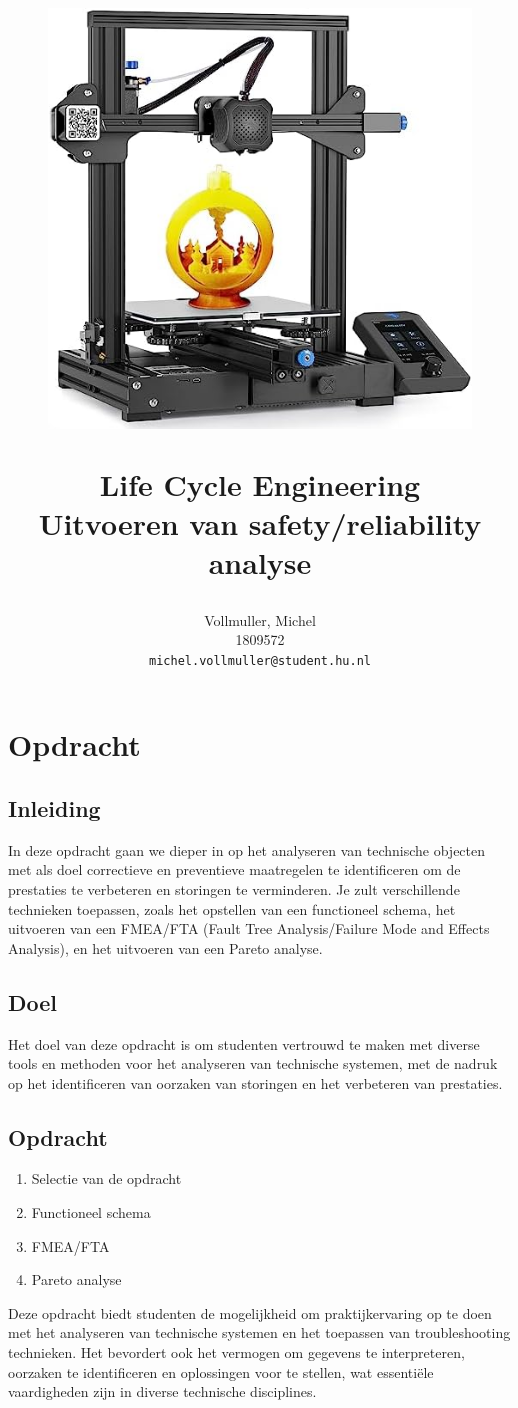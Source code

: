 \documentclass{article}
\title{
    \begin{figure}[H]
        \centering
        \includegraphics[scale = 1]{ender3.jpg} %
    \end{figure}
    Life Cycle Engineering \\
    \large Uitvoeren van safety/reliability analyse}
\author{
  Vollmuller, Michel\\
  1809572\\
  \texttt{michel.vollmuller@student.hu.nl}
}
\begin{document}
\maketitle

\tableofcontents

\setlength{\parindent}{0pt} %

\newpage
\section{Opdracht}
\subsection{Inleiding}
In deze opdracht gaan we dieper in op het analyseren van technische objecten met als doel correctieve en preventieve maatregelen te identificeren om de prestaties te verbeteren en storingen te verminderen. Je zult verschillende technieken toepassen, zoals het opstellen van een functioneel schema, het uitvoeren van een FMEA/FTA (Fault Tree Analysis/Failure Mode and Effects Analysis), en het uitvoeren van een Pareto analyse.

\subsection{Doel}
Het doel van deze opdracht is om studenten vertrouwd te maken met diverse tools en methoden voor het analyseren van technische systemen, met de nadruk op het identificeren van oorzaken van storingen en het verbeteren van prestaties.

\subsection{Opdracht}
\begin{enumerate}
  \item Selectie van de opdracht
  \item Functioneel schema
  \item FMEA/FTA
  \item Pareto analyse
\end{enumerate}

Deze opdracht biedt studenten de mogelijkheid om praktijkervaring op te doen met het analyseren van technische systemen en het toepassen van troubleshooting technieken. Het bevordert ook het vermogen om gegevens te interpreteren, oorzaken te identificeren en oplossingen voor te stellen, wat essentiële vaardigheden zijn in diverse technische disciplines.
\end{document}
